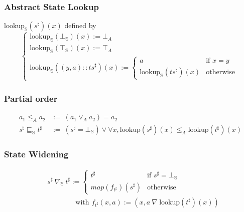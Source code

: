 \documentclass{beamer}
\begin{document}
\begin{frame}
    \frametitle{Abstract State Lookup}
    \( \text{lookup}_\mathbb{S}(s^{\sharp}) (x)\) defined by
    \[
    \begin{cases}
        \text{lookup}_\mathbb{S}(\bot_\mathbb{S})(x) := \bot_A \\  
        \text{lookup}_\mathbb{S}(\top_\mathbb{S})(x) := \top_A \\
        \text{lookup}_\mathbb{S}((y, a) :: {ts}^{\sharp}) (x) := \begin{cases}
            a & \text{if } x = y \\
            \text{lookup}_\mathbb{S}(ts^{\sharp})(x) & \text{otherwise}
            \end{cases} 
        \end{cases}
    \]
\end{frame}























\begin{frame}
    \frametitle{Partial order}
    \begin{align*}
        a_1 \le_A a_2 &:=\ (a_1 \vee_A a_2) = a_2 \\
        s^{\sharp} \sqsubseteq_\mathbb{S} t^{\sharp} &:=\ (s^{\sharp} = \bot_\mathbb{S}) \vee \forall x, \text{lookup} (s^{\sharp}) (x) \le_A \text{lookup} (t^{\sharp}) (x)
    \end{align*}
\end{frame}



\begin{frame}
    \frametitle{State Widening}
    \begin{align*} 
        &s^{\sharp}\ \nabla_\mathbb{S}\ t^{\sharp} := \begin{cases}
                                                    t^{\sharp}       & \text{if } s^{\sharp} = \bot_\mathbb{S}\\
                                                    map (f_{t^{\sharp}}) (s^{\sharp}) & \text{otherwise}
                                                    \end{cases} \\
    & \qquad \qquad \text{with } f_{t^{\sharp}}(x, a) := (x, a\ \nabla\ \text{lookup} (t^{\sharp}) (x))
    \end{align*}
\end{frame}
\end{document}
